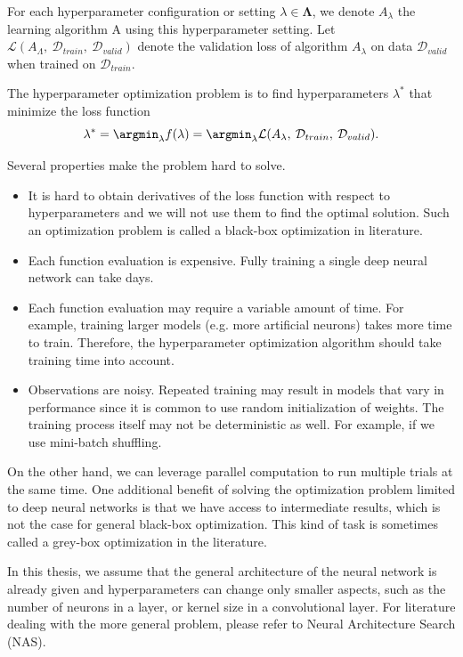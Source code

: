 For each hyperparameter configuration or setting $\lambda \in \mathbf{\Lambda}$, we denote $A_\lambda$ the learning algorithm A using this hyperparameter setting. Let $\mathcal{L}(A_\Lambda, \: \mathcal{D}_{train}, \: \mathcal{D}_{valid})$ denote the validation loss of algorithm $A_\lambda$ on data $\mathcal{D}_{valid}$ when trained on $\mathcal{D}_{train}$.

\begin{defn}\label{defn:x}
The hyperparameter optimization problem is to find hyperparameters $\lambda^*$ that minimize the loss function  \[\lambda^*=\argmin _\lambda f(\lambda)=\argmin_\lambda \mathcal{L}(A_\lambda, \: \mathcal{D}_{train}, \:  \mathcal{D}_{valid}).\]
\end{defn}

Several properties make the problem hard to solve.
\begin{itemize}
    \item It is hard to obtain derivatives of the loss function with respect to hyperparameters and we will not use them to find the optimal solution. Such an optimization problem is called a black-box optimization in literature.
    \item Each function evaluation is expensive. Fully training a single deep neural network can take days.
    \item Each function evaluation may require a variable amount of time. For example, training larger models (e.g. more artificial neurons) takes more time to train. Therefore, the hyperparameter optimization algorithm should take training time into account.
    \item Observations are noisy. Repeated training may result in models that vary in performance since it is common to use random initialization of weights. The training process itself may not be deterministic as well. For example, if we use mini-batch shuffling.
\end{itemize}

On the other hand, we can leverage parallel computation to run multiple trials at the same time. One additional benefit of solving the optimization problem limited to deep neural networks is that we have access to intermediate results, which is not the case for general black-box optimization. This kind of task is sometimes called a grey-box optimization in the literature.


In this thesis, we assume that the general architecture of the neural network is already given and hyperparameters can change only smaller aspects, such as the number of neurons in a layer, or kernel size in a convolutional layer. For literature dealing with the more general problem, please refer to Neural Architecture Search (NAS).

